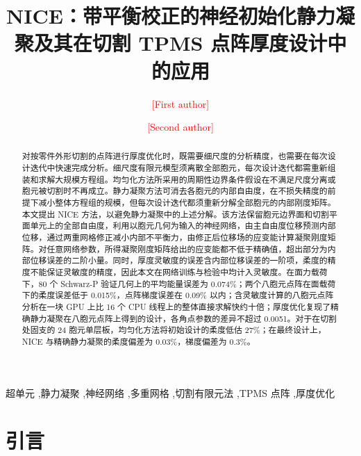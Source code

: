 \documentclass[preprint,12pt,authoryear]{elsarticle}
\begin{document}
\begin{frontmatter}
\title{NICE：带平衡校正的神经初始化静力凝聚及其在切割 TPMS 点阵厚度设计中的应用}
\author[a]{\textcolor{red}{[First author]}}
\author[a]{\textcolor{red}{[Second author]}}

\begin{abstract}
对按零件外形切割的点阵进行厚度优化时，既需要细尺度的分析精度，也需要在每次设计迭代中快速完成分析。细尺度有限元模型须离散全部胞元，每次设计迭代都需重新组装和求解大规模方程组。均匀化方法所采用的周期性边界条件假设在不满足尺度分离或胞元被切割时不再成立。静力凝聚方法可消去各胞元的内部自由度，在不损失精度的前提下减小整体方程组的规模，但每次设计迭代都须重新分解全部胞元的内部刚度矩阵。本文提出 NICE 方法，以避免静力凝聚中的上述分解。该方法保留胞元边界面和切割平面单元上的全部自由度，利用以胞元几何为输入的神经网络，由主自由度位移预测内部位移，通过两重网格修正减小内部不平衡力，由修正后位移场的应变能计算凝聚刚度矩阵。对任意网络参数，所得凝聚刚度矩阵给出的应变能都不低于精确值，超出部分为内部位移误差的二阶小量。同时，厚度灵敏度的误差含内部位移误差的一阶项，柔度的精度不能保证灵敏度的精度，因此本文在网络训练与检验中均计入灵敏度。在面力载荷下，80 个 Schwarz-P 验证几何上的平均能量误差为 0.074\%；两个八胞元点阵在面载荷下的柔度误差低于 0.015\%，点阵梯度误差在 0.09\% 以内；含灵敏度计算的八胞元点阵分析在一块 GPU 上比 16 个 CPU 线程上的整体直接求解快约十倍；厚度优化复现了精确静力凝聚在八胞元点阵上得到的设计，各角点参数的差异不超过 0.0051。对于在切割处固支的 24 胞元单层板，均匀化方法将初始设计的柔度低估 27\%；在最终设计上，NICE 与精确静力凝聚的柔度偏差为 0.03\%，梯度偏差为 0.3\%。
\end{abstract}
\begin{keyword}
超单元 \sep 静力凝聚 \sep 神经网络 \sep 多重网格 \sep 切割有限元法 \sep TPMS 点阵 \sep 厚度优化
\end{keyword}
\end{frontmatter}

\section{引言}
\end{document}
